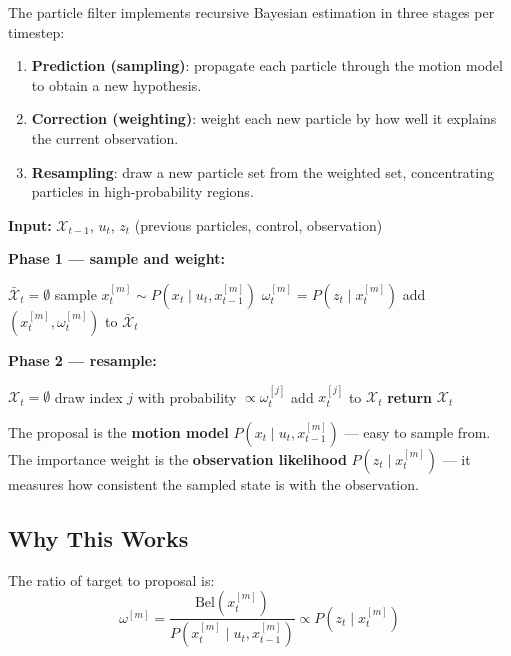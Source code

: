 \documentclass[11pt,a4paper]{article}
\theoremstyle{definition}
\theoremstyle{plain}
\theoremstyle{remark}
\begin{document}
The particle filter implements recursive Bayesian estimation in three stages per timestep:

\begin{enumerate}
    \item \textbf{Prediction (sampling)}: propagate each particle through the motion model to obtain a new hypothesis.
    \item \textbf{Correction (weighting)}: weight each new particle by how well it explains the current observation.
    \item \textbf{Resampling}: draw a new particle set from the weighted set, concentrating particles in high-probability regions.
\end{enumerate}

\begin{tcolorbox}[colback=blue!5!white,colframe=blue!75!black,title=\textbf{Particle Filter Algorithm}]
\textbf{Input:} $\mathcal{X}_{t-1}$, $u_t$, $z_t$ \quad (previous particles, control, observation)

\textbf{Phase 1 — sample and weight:}
\begin{algorithmic}
\STATE $\bar{\mathcal{X}}_t = \emptyset$
    \STATE sample $x_t^{[m]} \sim P(x_t \mid u_t, x_{t-1}^{[m]})$
    \STATE $\omega_t^{[m]} = P(z_t \mid x_t^{[m]})$
    \STATE add $(x_t^{[m]}, \omega_t^{[m]})$ to $\bar{\mathcal{X}}_t$
\ENDFOR
\end{algorithmic}

\textbf{Phase 2 — resample:}
\begin{algorithmic}
\STATE $\mathcal{X}_t = \emptyset$
    \STATE draw index $j$ with probability $\propto \omega_t^{[j]}$
    \STATE add $x_t^{[j]}$ to $\mathcal{X}_t$
\ENDFOR
\STATE \textbf{return} $\mathcal{X}_t$
\end{algorithmic}
\end{tcolorbox}

The proposal is the \textbf{motion model} $P(x_t \mid u_t, x_{t-1}^{[m]})$ — easy to sample from. The importance weight is the \textbf{observation likelihood} $P(z_t \mid x_t^{[m]})$ — it measures how consistent the sampled state is with the observation.

\subsection{Why This Works}

The ratio of target to proposal is:
\[
\omega^{[m]} = \frac{\mathrm{Bel}(x_t^{[m]})}{P(x_t^{[m]} \mid u_t, x_{t-1}^{[m]})} \propto P(z_t \mid x_t^{[m]})
\]
\end{document}
